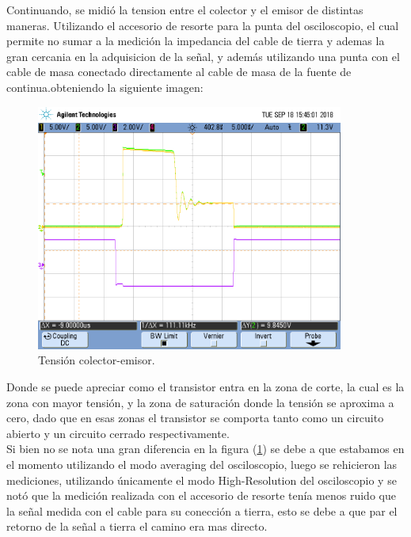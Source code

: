 Continuando, se midió la tension entre el colector y el emisor de distintas maneras. Utilizando el accesorio de resorte para la punta del osciloscopio, el cual permite no sumar a la medición la impedancia del cable de tierra y ademas la gran cercania en la adquisicion de la señal,  y además utilizando una punta con el cable de masa conectado directamente al cable de masa de la fuente de continua.obteniendo la siguiente imagen:
\begin{figure}[H]
	\centering
	\includegraphics[width=0.9\textwidth]{Imagenes/vce_pe_both.png}
\caption{Tensión colector-emisor.}
	\label{fig:vce}
\end{figure}
Donde se puede apreciar como el transistor entra en la zona de corte, la cual es la zona con mayor tensión, y la zona de saturación donde la tensión se aproxima a cero, dado que en esas zonas el transistor se comporta tanto como un circuito abierto y un circuito cerrado respectivamente.\\Si bien no se nota una gran  diferencia  en la figura (\ref{fig:vce}) se debe a que estabamos en el momento utilizando el modo averaging del osciloscopio, luego se rehicieron las mediciones, utilizando únicamente el modo High-Resolution del osciloscopio y se notó que la medición realizada con el accesorio de resorte tenía menos ruido que la señal medida con el cable para su conección a tierra, esto se debe a que par el retorno de la señal a tierra el camino era mas directo. 


